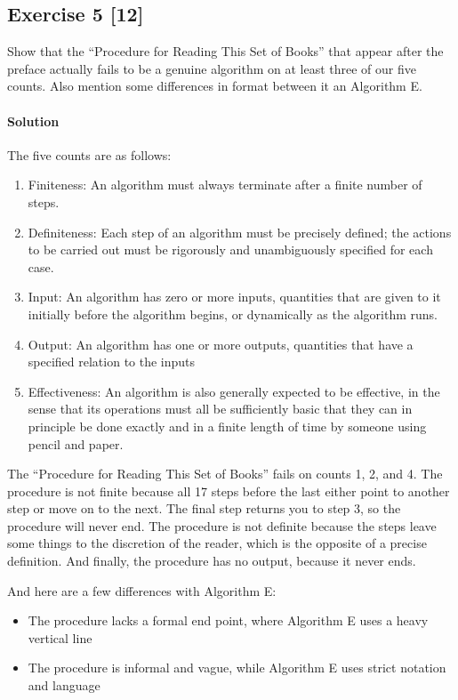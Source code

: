 \documentclass{report}
\newcommand{\say}[1]{``#1''}
\begin{document}
		
		\subsection*{Exercise 5 [12]} 
		
			Show that the \say{Procedure for Reading This Set of Books} that appear after the preface actually fails to be a genuine algorithm on at least three of our five counts. Also mention some differences in format between it an Algorithm E.
			
			\paragraph{Solution} The five counts are as follows:
			
			\begin{enumerate}
				\item Finiteness: An algorithm must always terminate after a finite number of steps.
				\item Definiteness: Each step of an algorithm must be precisely defined; the actions to be carried out must be rigorously and unambiguously specified for each case.
				\item Input: An algorithm has zero or more inputs, quantities that are given to it initially before the algorithm begins, or dynamically as the algorithm runs.
				\item Output: An algorithm has one or more outputs, quantities that have a specified relation to the inputs
				\item Effectiveness: An algorithm is also generally expected to be effective, in the sense that its operations must all be sufficiently basic that they can in principle be done exactly and in a finite length of time by someone using pencil and paper.
			\end{enumerate}
			
			The \say{Procedure for Reading This Set of Books} fails on counts 1, 2, and 4. The procedure is not finite because all 17 steps before the last either point to another step or move on to the next. The final step returns you to step 3, so the procedure will never end. The procedure is not definite because the steps leave some things to the discretion of the reader, which is the opposite of a precise definition. And finally, the procedure has no output, because it never ends.
			
			And here are a few differences with Algorithm E:
			\begin{itemize}
				\item The procedure lacks a formal end point, where Algorithm E uses a heavy vertical line
				\item The procedure is informal and vague, while Algorithm E uses strict notation and language
			\end{itemize}
			
\end{document}
